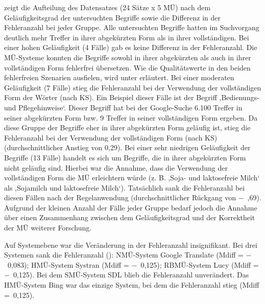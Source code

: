  zeigt die Aufteilung des Datensatzes (24 Sätze x 5 MÜ) nach dem Geläufigkeitsgrad der untersuchten Begriffe sowie die Differenz in der Fehleranzahl bei jeder Gruppe. Alle untersuchten Begriffe hatten im Suchvorgang deutlich mehr Treffer in ihrer abgekürzten Form als in ihrer vollständigen. Bei einer hohen Geläufigkeit (4 Fälle) gab es keine Differenz in der Fehleranzahl. Die MÜ-Systeme konnten die Begriffe sowohl in ihrer abgekürzten als auch in ihrer vollständigen Form fehlerfrei übersetzen. Wie die Qualitätswerte in den beiden fehlerfreien Szenarien ausfielen, wird unter  erläutert. Bei einer moderaten Geläufigkeit (7 Fälle) stieg die Fehleranzahl bei der Verwendung der vollständigen Form der Wörter (nach KS). Ein Beispiel dieser Fälle ist der Begriff ‚Bedienungs- und Pflegehinweise‘. Dieser Begriff hat bei der Google-Suche 6.100 Treffer in seiner abgekürzten Form bzw. 9 Treffer in seiner vollständigen Form ergeben. Da diese Gruppe der Begriffe eher in ihrer abgekürzten Form geläufig ist, stieg die Fehleranzahl bei der Verwendung der vollständigen Form (nach KS) (durchschnittlicher Anstieg von 0,29). Bei einer sehr niedrigen Geläufigkeit der Begriffe (13 Fälle) handelt es sich um Begriffe, die in ihrer abgekürzten Form nicht geläufig sind. Hierbei war die Annahme, dass die Verwendung der vollständigen Form die MÜ erleichtern würde (z. B. ‚Soja- und laktosefreie Milch‘ als ‚Sojamilch und laktosefreie Milch‘). Tatsächlich sank die Fehleranzahl bei diesen Fällen nach der Regelanwendung (durchschnittlicher Rückgang von $-$~,69). Aufgrund der kleinen Anzahl der Fälle jeder Gruppe bedarf jedoch die Annahme über einen Zusammenhang zwischen dem Geläufigkeitsgrad und der Korrektheit der MÜ weiterer Forschung.


Auf Systemebene war die Veränderung in der Fehleranzahl insignifikant. Bei drei Systemen sank die Fehleranzahl (): NMÜ-System Google Translate (Mdiff = $-$~0,083); HMÜ-System Systran (Mdiff = $-$~0,125); RBMÜ-System Lucy (Mdiff = $-$~0,125). Bei dem SMÜ-System SDL blieb die Fehleranzahl unverändert. Das HMÜ-System Bing\textbf{ }war das einzige System, bei dem die Fehleranzahl stieg (Mdiff =~0,125).


